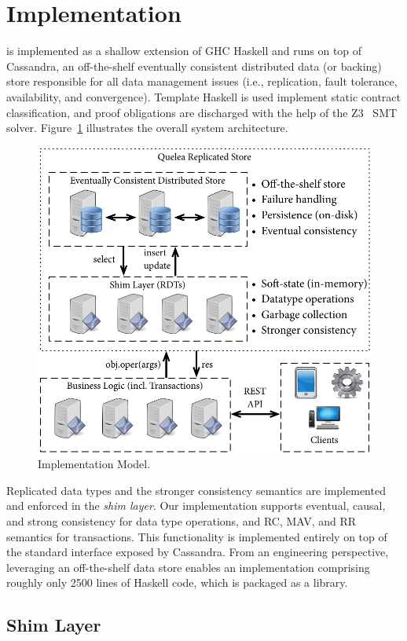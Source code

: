 \section{Implementation}
\label{sec:impl}

\name is implemented as a shallow extension of GHC Haskell and runs on top of
Cassandra, an off-the-shelf eventually consistent distributed data (or backing)
store responsible for all data management issues (i.e., replication, fault
tolerance, availability, and convergence).  Template Haskell is used implement
static contract classification, and proof obligations are discharged with the
help of the Z3~\cite{Z3} SMT solver. Figure~\ref{fig:impl_mod} illustrates the
overall system architecture.

\begin{figure}
\begin{center}
\includegraphics[width=0.7\columnwidth]{Figures/ImplModel}
\end{center}
\caption{Implementation Model.}
\label{fig:impl_mod}
\end{figure}

Replicated data types and the stronger consistency semantics are implemented
and enforced in the \emph{shim layer}. Our implementation supports eventual,
causal, and strong consistency for data type operations, and RC, MAV, and RR
semantics for transactions.  This functionality is implemented entirely on top
of the standard interface exposed by Cassandra. From an engineering
perspective, leveraging an off-the-shelf data store enables an implementation
comprising roughly only 2500 lines of Haskell code, which is packaged as a
library.

\subsection{Shim Layer}

